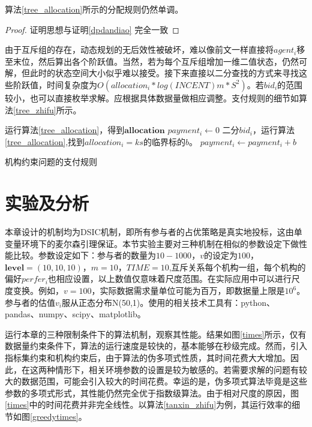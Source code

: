 \documentclass[promaster]{thesis-uestc}
\begin{document}
\begin{theorem}
 算法\ref{tree_allocation}所示的分配规则仍然单调。 
\end{theorem}

\begin{proof}
证明思想与证明\ref{dpdandiao} 完全一致
\end{proof}

由于互斥组的存在，动态规划的无后效性被破坏，难以像前文一样直接将$agent_i$移至末位，然后算出各个阶跃值。当然，若为每个互斥组增加一维二值状态，仍然可解，但此时的状态空间大小似乎难以接受。接下来直接以二分查找的方式来寻找这些阶跃值，时间复杂度为$O(allocation_i*log(INCENT)m*S^2)$。若$bid_i$的范围较小，也可以直接枚举求解。应根据具体数据量做相应调整。支付规则的细节如算法\ref{tree_zhifu}所示。

\begin{algorithm}[h]
    运行算法\ref{tree_allocation}，得到$\mathbf{allocation}$\;
    {
        $payment_i \leftarrow 0$\;
        {
            二分$bid_i$，运行算法\ref{tree_allocation},找到$allocation_i = ks$的临界标的$b$。
            $payment_i \leftarrow payment_i + b$
        }
    }
\caption{机构约束问题的支付规则}
\label{tree_zhifu}
\end{algorithm}

\FloatBarrier

\section{实验及分析}
本章设计的机制均为DSIC机制，即所有参与者的占优策略是真实地投标，这由单变量环境下的麦尔森引理保证。本节实验主要对三种机制在相似的参数设定下做性能比较。参数设定如下：参与者的数量为$10-1000$，$v$的设定为$100$，$\mathbf{level}=(10,10,10)$，$m=10$，$TIME=10$,互斥关系每个机构一组，每个机构的偏好$perfer_i$也相应设置，以上数值仅意味着尺度范围。在实际应用中可以进行尺度变换。例如，$v=100$，实际数据需求量单位可能为百万，即数据量上限是$10^6$。参与者的估值$v_i$服从正态分布N(50,1)。使用的相关技术工具有：python、pandas、numpy、scipy、matplotlib。

运行本章的三种限制条件下的算法机制，观察其性能。结果如图\ref{times}所示，仅有数据量约束条件下，算法的运行速度是较快的，基本能够在秒级完成。然而，引入指标集约束和机构约束后，由于算法的伪多项式性质，其时间花费大大增加。因此，在这两种情形下，相关环境参数的设置是较为敏感的。若需要求解的问题有较大的数据范围，可能会引入较大的时间花费。幸运的是，伪多项式算法毕竟是这些参数的多项式形式，其性能仍然完全优于指数级算法。由于相对尺度的原因，图\ref{times}中的时间花费并非完全线性。以算法\ref{tanxin_zhifu}为例，其运行效率的细节如图\ref{greedytimes}。
\end{document}
